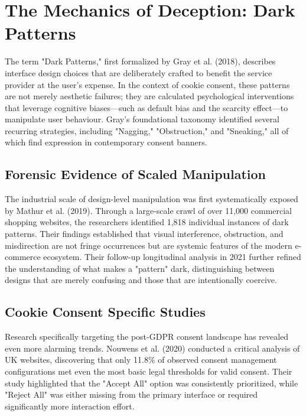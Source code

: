 \documentclass[12pt,a4paper]{report}
\begin{document}
\section{The Mechanics of Deception: Dark Patterns}

The term "Dark Patterns," first formalized by Gray et al. (2018), describes interface design choices that are deliberately crafted to benefit the service provider at the user’s expense. In the context of cookie consent, these patterns are not merely aesthetic failures; they are calculated psychological interventions that leverage cognitive biases—such as default bias and the scarcity effect—to manipulate user behaviour. Gray’s foundational taxonomy identified several recurring strategies, including "Nagging," "Obstruction," and "Sneaking," all of which find expression in contemporary consent banners.

\subsection{Forensic Evidence of Scaled Manipulation}

The industrial scale of design-level manipulation was first systematically exposed by Mathur et al. (2019). Through a large-scale crawl of over 11,000 commercial shopping websites, the researchers identified 1,818 individual instances of dark patterns. Their findings established that visual interference, obstruction, and misdirection are not fringe occurrences but are systemic features of the modern e-commerce ecosystem. Their follow-up longitudinal analysis in 2021 further refined the understanding of what makes a "pattern" dark, distinguishing between designs that are merely confusing and those that are intentionally coercive.

\subsection{Cookie Consent Specific Studies}

Research specifically targeting the post-GDPR consent landscape has revealed even more alarming trends. Nouwens et al. (2020) conducted a critical analysis of UK websites, discovering that only 11.8\% of observed consent management configurations met even the most basic legal thresholds for valid consent. Their study highlighted that the "Accept All" option was consistently prioritized, while "Reject All" was either missing from the primary interface or required significantly more interaction effort.
\end{document}
